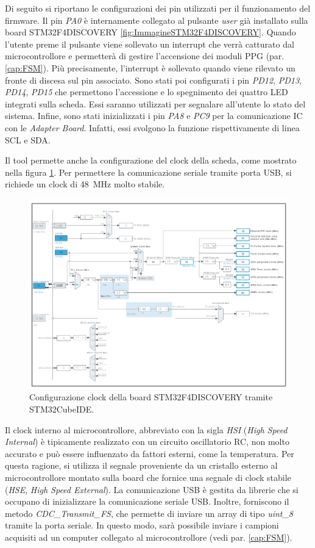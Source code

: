 Di seguito si riportano le configurazioni dei pin utilizzati per il funzionamento del firmware. Il pin \textit{PA0} è internamente collegato al pulsante \textit{user} già installato sulla board STM32F4DISCOVERY \ref{fig:ImmagineSTM32F4DISCOVERY}. Quando l'utente preme il pulsante viene sollevato un interrupt che verrà catturato dal microcontrollore e permetterà di gestire l'accensione dei moduli PPG  (par. \ref{cap:FSM}). Più precisamente, l'interrupt è sollevato quando viene rilevato un fronte di discesa sul pin associato. Sono stati poi configurati i pin \textit{PD12}, \textit{PD13}, \textit{PD14}, \textit{PD15} che permettono l'accessione e lo spegnimento dei quattro LED integrati sulla scheda. Essi saranno utilizzati per segnalare all'utente lo stato del sistema. Infine, sono stati inizializzati i pin \textit{PA8} e \textit{PC9} per la comunicazione IC con le \textit{Adapter Board}. Infatti, essi svolgono la funzione rispettivamente di linea SCL e SDA.

Il tool permette anche la configurazione del clock della scheda, come mostrato nella figura \ref{fig:Clock}. Per permettere la comunicazione seriale tramite porta USB, si richiede un clock di \SI{48}{\mega\hertz} molto stabile. 
 \begin{figure}[tbh]
 	\centering
 	\includegraphics[width=0.9\linewidth]{ImageFiles/Firmware/Clock}
 	\caption{Configurazione clock della board STM32F4DISCOVERY tramite STM32CubeIDE.}
 	\label{fig:Clock}
 \end{figure}
Il clock interno al microcontrollore, abbreviato con la sigla \textit{HSI} (\textit{High Speed Internal}) è tipicamente realizzato con un circuito oscillatorio RC, non molto accurato e può essere influenzato da fattori esterni, come la temperatura. Per questa ragione, si utilizza il segnale proveniente da un cristallo esterno al microcontrollore montato sulla board che fornice una segnale di clock stabile (\textit{HSE}, \textit{High Speed External}). La comunicazione USB è gestita da librerie  che si occupano di inizializzare la comunicazione seriale USB. Inoltre, forniscono il metodo \textit{CDC\_Transmit\_FS}, che permette di inviare un array di tipo \textit{uint\_8} tramite la porta seriale. In questo modo, sarà possibile inviare i campioni acquisiti ad un computer collegato al microcontrollore (vedi par. \ref{cap:FSM}).

\clearpage
